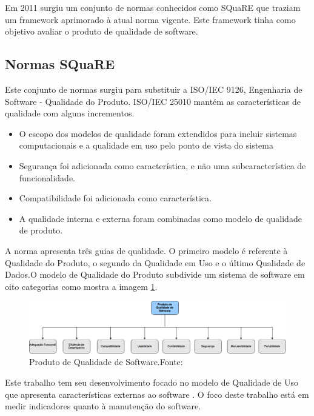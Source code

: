 Em 2011 surgiu um conjunto de normas conhecidos como SQuaRE que traziam um framework aprimorado à atual norma vigente. Este framework tinha como objetivo avaliar o produto de qualidade de software.

\subsection{Normas SQuaRE}
Este conjunto de normas surgiu para substituir a ISO/IEC 9126, Engenharia de Software - Qualidade do Produto. ISO/IEC 25010 mantém as características de qualidade com alguns incrementos.

\begin{itemize}
\item O escopo dos modelos de qualidade foram extendidos para incluir sistemas computacionais e a qualidade em uso pelo ponto de vista do sistema
\item Segurança foi adicionada como característica, e não uma subcaracterística de funcionalidade.
\item Compatibilidade foi adicionada como característica.
\item A qualidade interna e externa foram combinadas como modelo de qualidade de produto.
\end{itemize}

A norma apresenta três guias de qualidade. O primeiro modelo é referente à Qualidade do Produto, o segundo da Qualidade em Uso e o último Qualidade de Dados.O modelo de Qualidade do Produto subdivide um sistema de software em oito categorias como mostra a imagem \ref{img:modelo_square}.
\graphicspath{{figuras/}}
\begin{figure}
\centering
\includegraphics[scale=0.40]{SQuaRE}
\caption{Produto de Qualidade de Software.Fonte:\cite{Square}}
\label{img:modelo_square}
\end{figure}

Este trabalho tem seu desenvolvimento focado no modelo de Qualidade de Uso que apresenta características externas ao software \cite{Square}. O foco deste trabalho está em medir indicadores quanto à manutenção do software.  

